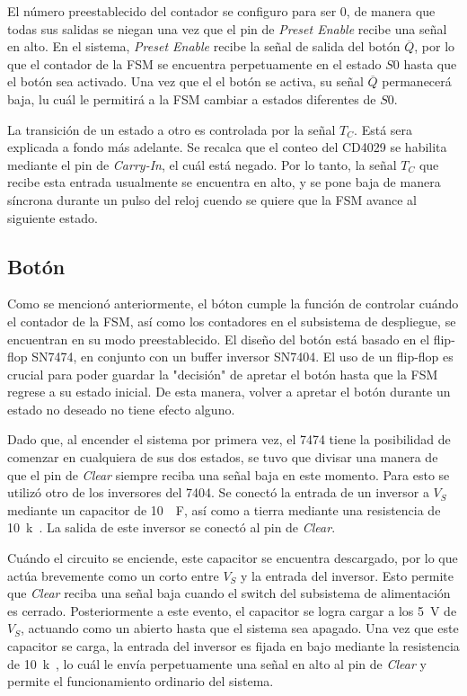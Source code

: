 \documentclass[12pt,onecolumn]{IEEEtran}
\begin{document}
El número preestablecido del contador se configuro para ser 0, de manera que todas sus salidas se niegan una vez que el pin de \textit{Preset Enable} recibe una señal en alto. En el sistema, \textit{Preset Enable} recibe la señal de salida del botón $\overline{Q}$, por lo que el contador de la FSM se encuentra perpetuamente en el estado $S0$ hasta que el botón sea activado. Una vez que el el botón se activa, su señal $\overline{Q}$ permanecerá baja, lu cuál le permitirá a la FSM cambiar a estados diferentes de $S0$.


La transición de un estado a otro es controlada por la señal $T_C$. Está sera explicada a fondo más adelante. Se recalca que el conteo del CD4029 se habilita mediante el pin de \textit{Carry-In}, el cuál está negado. Por lo tanto, la señal $T_C$ que recibe esta entrada usualmente se encuentra en alto, y se pone baja de manera síncrona durante un pulso del reloj cuendo se quiere que la FSM avance al siguiente estado. 

\subsection{Botón}

Como se mencionó anteriormente, el bóton cumple la función de controlar cuándo el contador de la FSM, así como los contadores en el subsistema de despliegue, se encuentran en su modo preestablecido. El diseño del botón está basado en el flip-flop SN7474, en conjunto con un buffer inversor SN7404. El uso de un flip-flop es crucial para poder guardar la "decisión" de apretar el botón hasta que la FSM regrese a su estado inicial. De esta manera, volver a apretar el botón durante un estado no deseado no tiene efecto alguno.


Dado que, al encender el sistema por primera vez, el 7474 tiene la posibilidad de comenzar en cualquiera de sus dos estados, se tuvo que divisar una manera de que el pin de \textit{Clear} siempre reciba una señal baja en este momento. Para esto se utilizó otro de los inversores del 7404. Se conectó la entrada de un inversor a $V_S$ mediante un capacitor de \qty{10}{\mu F}, así como a tierra mediante una resistencia de \qty{10}{k\Omega}. La salida de este inversor se conectó al pin de \textit{Clear}.

Cuándo el circuito se enciende, este capacitor se encuentra descargado, por lo que actúa brevemente como un corto entre $V_S$ y la entrada del inversor. Esto permite que \textit{Clear} reciba una señal baja cuando el switch del subsistema de alimentación es cerrado. Posteriormente a este evento, el capacitor se logra cargar a los \qty{5}{V} de $V_S$, actuando como un abierto hasta que el sistema sea apagado. Una vez que este capacitor se carga, la entrada del inversor es fijada en bajo mediante la resistencia de \qty{10}{k\Omega}, lo cuál le envía perpetuamente una señal en alto al pin de \textit{Clear} y permite el funcionamiento ordinario del sistema. 
\end{document}
